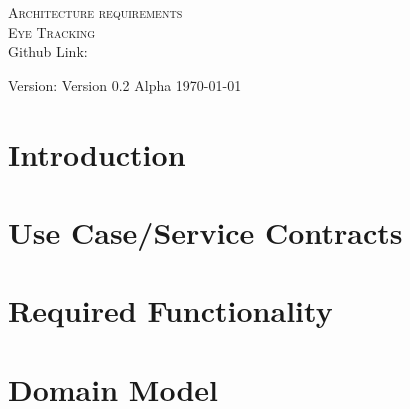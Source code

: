 \documentclass[a4paper,12pt]{report}
\begin{document}
\renewcommand{\thesection}{\arabic{section}}
\newpage
\begin{center}
\textsc{\LARGE Architecture requirements}\\[1.5cm]
\textsc{\Large Eye Tracking}\\[0.5cm]

Github Link:

Version: Version 0.2 Alpha 
\today
\end{center}
\tableofcontents{}
\listoffigures{}
\newpage
\section{Introduction}
	
	\newpage
\section{Use Case/Service Contracts}
	
	\newpage
\section{Required Functionality}
	
	\newpage
\section{Domain Model}
	
	\newpage
\begin{thebibliography}{9}
	
\end{thebibliography}
\end{document}
